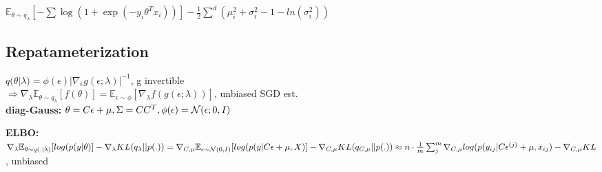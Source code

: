 $\mathbb{E}_{\theta \sim q_\lambda}[-\sum \log (1+ \exp(-y_i\theta^Tx_i))] - \frac{1}{2}\sum^d (\mu_i^2 + \sigma_i^2 - 1 - ln(\sigma_i^2))$
\begin{comment}
	This is the Elbo for Bayesian regression.\\
	Problem: For the expectation term, it is hard to take the derivative, since we can't just push the expectation in. The distribution q itself depends on the parameters theta.\\
\end{comment}

\subsection{Repatameterization}
$q(\theta|\lambda) = \phi(\epsilon) |\nabla_\epsilon g(\epsilon; \lambda)|^{-1}$, g invertible\\
$\Rightarrow \nabla_\lambda \mathbb{E}_{\theta \sim q_\lambda}[f(\theta)]
 = \mathbb{E}_{\epsilon \sim \phi}[\nabla_\lambda f(g(\epsilon; \lambda))]$, unbiased SGD est.\\
 
\textbf{diag-Gauss:} $\theta = C\epsilon + \mu, \Sigma = CC^T, \phi(\epsilon) = \mathcal{N}(\epsilon; 0,I)$\\
\begin{comment}
	\textbf{Diagonal Gaussian:} In this case, C is just the square root of the variances.\\
	$\theta$ is now obtain by sampling from the standard normal distribution, adding mu and multiplying by C. 
	The standard rules of affine transformations of gaussians hold.\\
	\textbf{Performance:} For diagonal q, only twice as expensive as MAP inference.
\end{comment}

\textbf{ELBO:} $\nabla_\lambda \mathbb{E}_{\theta \sim q(.|\lambda)}[log(p(y|\theta)] - \nabla_\lambda KL(q_\lambda || p(.))\\ 
= \nabla_{C, \mu} \mathbb{E}_{\epsilon \sim \mathcal{N}(0,I)} [log(p(y|C\epsilon+\mu, X)] - \nabla_{C,\mu} KL(q_{C,\mu} || p(.))\\
\approx n \cdot \frac{1}{m} \sum_j^m \nabla_{C, \mu} log(p(y_{ij}|C\epsilon^{(j)}+\mu, x_{ij}) - \nabla_{C, \mu} KL$, unbiased\\
\begin{comment}
	$\nabla_\lambda \mathbb{E}_{\theta \sim q(.|\lambda)}[log(p(y|\theta)]
	= \nabla_{C, \mu} \mathbb{E}_{\epsilon \sim \cN(0,I)} [log(p(y|C\epsilon+\mu, X)] \\ 
	= \nabla_{C, \mu} \mathbb{E}_{\epsilon \sim \cN(0,I)} [n \frac{1}{n}\sum log(p(y_i|C\epsilon+\mu, x_i)] \\
	= n \cdot \mathbb{E}_{\epsilon \sim \cN(0,I)} \mathbb{E}_{i \sim Uniform} [\nabla_{C, \mu} log(p(y_i|C\epsilon+\mu, x_i)]$\\
\end{comment}


